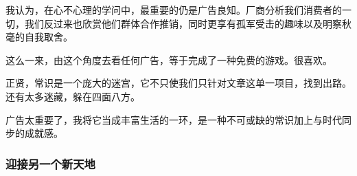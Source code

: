 \par 我认为，在心不心理的学问中，最重要的仍是广告良知。厂商分析我们消费者的一切，我们反过来也欣赏他们群体合作推销，同时更享有孤军受击的趣味以及明察秋毫的自我取舍。
\par 这么一来，由这个角度去看任何广告，等于完成了一种免费的游戏。很喜欢。
\par 正贤，常识是一个庞大的迷宫，它不只使我们只针对文章这单一项目，找到出路。还有太多迷藏，躲在四面八方。
\par 广告太重要了，我将它当成丰富生活的一环，是一种不可或缺的常识加上与时代同步的成就感。
\par {}




\subsubsection{迎接另一个新天地}

